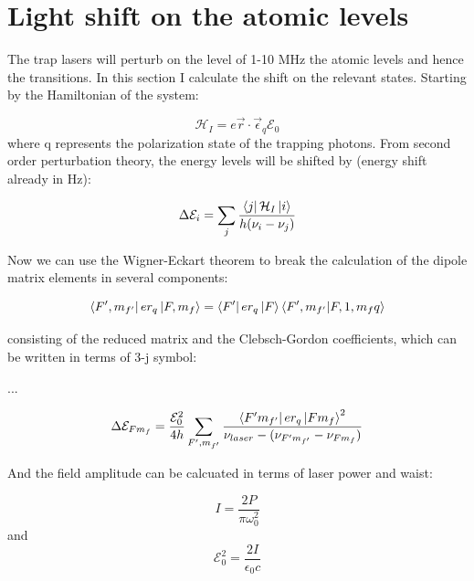 \documentclass[
10pt, %
a4paper, %
oneside, %
headinclude,footinclude, %
BCOR5mm, %
]{scrartcl}
\begin{document}
\clearpage
\newpage



\section{Light shift on the atomic levels}

The trap lasers will perturb on the level of 1-10 MHz the atomic levels and hence the transitions. In this section I calculate the shift on the relevant states. Starting by the Hamiltonian of the system:

\begin{equation}
 	\mathcal{H}_{I} = e \vec{r} \cdot \vec{\epsilon}_{q} \mathcal{E}_{0}
 \end{equation} 
where q represents the polarization state of the trapping photons. From second order perturbation theory, the energy levels will be shifted by (energy shift already in Hz):

\begin{equation}
	\Delta \mathcal{E}_{i} = \sum_{j} \frac{\bra{j}\mathcal{H}_{I} \ket{i} }{ h (\nu_{i} - \nu_{j})}
\end{equation}

Now we can use the Wigner-Eckart theorem to break the calculation of the dipole matrix elements in several components:

\begin{equation}
	\bra{F', m_{f'}} er_{q} \ket{F, m_{f}} = \bra{F'} er_{q} \ket{F} \bra{F', m_{f'}} \ket{F, 1, m_{f} q}
\end{equation}

consisting of the reduced matrix and the Clebsch-Gordon coefficients, which can be written in terms of 3-j symbol:

...

\begin{equation}
	\Delta \mathcal{E}_{F m_{f}} = \frac{\mathcal{E}^{2}_{0}} {4h} \sum_{F', m_{f'}} \frac{\bra{F' m_{f'}} er_{q} \ket{F m_{f}} ^{2} }{ \nu_{laser} - (\nu_{F' m_{f'}} - \nu_{F m_{f}})}
\end{equation}

And the field amplitude can be calcuated in terms of laser power and waist:

\begin{equation}
	I = \frac{2P}{\pi \omega^{2}_{0}}
\end{equation}
and
\begin{equation}
	\mathcal{E}^{2}_{0} = \frac{2I}{\epsilon_{0} c}
\end{equation}
\clearpage
\newpage
\end{document}
